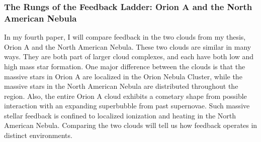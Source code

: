 \subsubsection{The Rungs of the Feedback Ladder: Orion A and the North American Nebula}\label{sec:paper4}
        In my fourth paper, I will compare feedback in the two clouds from my thesis, Orion A and the North American Nebula. These two clouds are similar in many ways. They are both part of larger cloud complexes, and each have both low and high mass star formation. One major difference between the clouds is that the massive stars in Orion A are localized in the Orion Nebula Cluster, while the massive stars in the North American Nebula are distributed throughout the region. Also, the entire Orion A cloud exhibits a cometary shape from possible interaction with an expanding superbubble from past supernovae. Such massive stellar feedback is confined to localized ionization and heating in the North American Nebula. Comparing the two clouds will tell us how feedback operates in distinct environments.